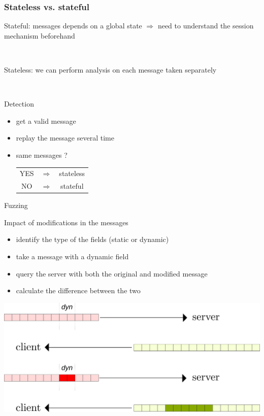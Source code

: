 \begin{frame}\frametitle{Stateless vs. stateful}

  Stateful: messages depends on a global state $\Rightarrow$ need to understand the session mechanism beforehand

  ~

  Stateless: we can perform analysis on each message taken separately

  ~

  \begin{block}{Detection}
    \begin{itemize}
      \item get a valid message
      \item replay the message several time
      \item same messages ? \begin{tabular}{ccc}YES &$\Rightarrow$& stateless\\NO &$\Rightarrow$& stateful\end{tabular}
    \end{itemize}
  \end{block}
\end{frame}

\begin{frame}{Fuzzing}

  Impact of modifications in the messages

  \begin{itemize}
    \item identify the type of the fields (static or dynamic)
    \item take a message with a dynamic field
    \item query the server with both the original and modified message
    \item calculate the difference between the two
  \end{itemize}

  \begin{center}\includegraphics[scale=0.4]{modify.png}\end{center}

\end{frame}
